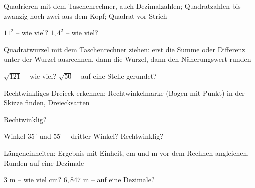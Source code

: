 \setcounter{aufgabe}{0}

\begin{aufgabe}{Quadrieren mit dem Taschenrechner, auch Dezimalzahlen; Quadratzahlen bis zwanzig hoch zwei aus dem Kopf; Quadrat vor Strich}
\begin{teile}
\teil $11^2$ – wie viel? \leerfeld
\teil $1{,}4^2$ – wie viel? \leerfeld
\end{teile}
\end{aufgabe}

\begin{aufgabe}{Quadratwurzel mit dem Taschenrechner ziehen: erst die Summe oder Differenz unter der Wurzel ausrechnen, dann die Wurzel, dann den Näherungswert runden}
\begin{teile}
\teil $\sqrt{121}$ – wie viel? \leerfeld
\teil $\sqrt{50}$ – auf eine Stelle gerundet? \leerfeld
\end{teile}
\end{aufgabe}

\begin{aufgabe}{Rechtwinkliges Dreieck erkennen: Rechtwinkelmarke (Bogen mit Punkt) in der Skizze finden, Dreiecksarten}
\begin{teile}
\teil Rechtwinklig? \janein

\teil Winkel $35^\circ$ und $55^\circ$ – dritter Winkel? Rechtwinklig? \leerfeld[°]
\end{teile}
\end{aufgabe}

\begin{aufgabe}{Längeneinheiten: Ergebnis mit Einheit, cm und m vor dem Rechnen angleichen, Runden auf eine Dezimale}
\begin{teile}
\teil $3$ m – wie viel cm? \leerfeld[cm]
\teil $6{,}847$ m – auf eine Dezimale? \leerfeld[m]
\end{teile}
\end{aufgabe}


